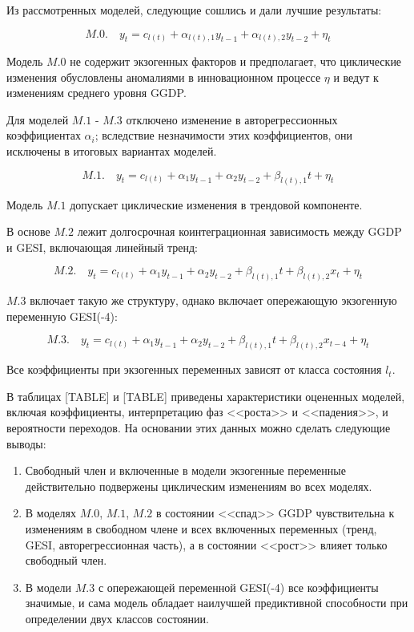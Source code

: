 \documentclass[a4paper,14pt]{extreport}
\begin{document}
Из рассмотренных моделей, следующие сошлись и дали лучшие результаты:

\[
	M.0. \quad y_t = c_{l(t)} + \alpha_{l(t), 1} y_{t-1} + \alpha_{l(t), 2} y_{t-2} + \eta_t
\]

Модель $M.0$ не содержит экзогенных факторов и предполагает, что циклические изменения обусловлены аномалиями в инновационном процессе $\eta$ и ведут к изменениям среднего уровня GGDP.

Для моделей $M.1$ - $M.3$ отключено изменение в авторегрессионных коэффициентах $\alpha_i$; вследствие незначимости этих коэффициентов, они исключены в итоговых вариантах моделей.

\[
	M.1. \quad y_t = c_{l(t)} + \alpha_1 y_{t-1} + \alpha_2 y_{t-2} + \beta_{l(t), 1} t + \eta_t
\]

Модель $M.1$ допускает циклические изменения в трендовой компоненте. 


В основе $M.2$ лежит долгосрочная коинтеграционная зависимость между GGDP и GESI, включающая линейный тренд:

\[
	M.2. \quad y_t = c_{l(t)} + \alpha_1 y_{t-1} + \alpha_2 y_{t-2} + \beta_{l(t), 1} t + \beta_{l(t), 2} x_{t} + \eta_t
\]

$M.3$ включает такую же структуру, однако включает опережающую экзогенную переменную GESI(-4):

\[
	M.3. \quad y_t = c_{l(t)} + \alpha_1 y_{t-1} + \alpha_2 y_{t-2} + \beta_{l(t), 1} t + \beta_{l(t), 2} x_{t-4} + \eta_t
\]

Все коэффициенты при экзогенных переменных зависят от класса состояния $l_t$.

В таблицах [TABLE] и [TABLE] приведены характеристики оцененных моделей, включая коэффициенты, интерпретацию фаз <<роста>> и <<падения>>, и вероятности переходов. На основании этих данных можно сделать следующие выводы:

\begin{enumerate}
	\item Свободный член и включенные в модели экзогенные переменные действительно подвержены циклическим изменениям во всех моделях.
	\item В моделях $M.0$, $M.1$, $M.2$ в состоянии <<спад>> GGDP чувствительна к изменениям в свободном члене и всех включенных переменных (тренд, GESI, авторегрессионная часть), а в состоянии <<рост>> влияет только свободный член.
	\item В модели $M.3$ с опережающей переменной GESI(-4) все коэффициенты значимые, и сама модель обладает наилучшей предиктивной способности при определении двух классов состоянии.
\end{enumerate}
\end{document}
